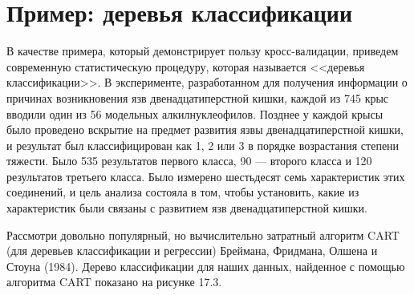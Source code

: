 \section{Пример: деревья классификации}
В качестве примера, который демонстрирует пользу кросс-валидации, приведем современную статистическую процедуру, которая называется <<деревья классификации>>. В эксперименте, разработанном для получения информации о причинах возникновения язв двенадцатиперстной кишки, каждой из 745 крыс вводили один из 56 модельных алкилнуклеофилов. Позднее у каждой крысы было проведено вскрытие на предмет развития язвы двенадцатиперстной кишки, и результат был классифицирован как 1, 2 или 3 в порядке возрастания степени тяжести. Было 535 результатов первого класса, 90 --- второго класса и 120 результатов третьего класса. Было измерено шестьдесят семь характеристик этих соединений, и цель анализа состояла в том, чтобы установить, какие из характеристик были связаны с развитием язв двенадцатиперстной кишки.
\begin{figure}[h]
\end{figure}

Рассмотри довольно популярный, но вычислительно затратный алгоритм CART (для деревьев классификации и регрессии) Бреймана, Фридмана, Олшена и Стоуна (1984). Дерево классификации для наших данных, найденное с помощью алгоритма CART показано на рисунке 17.3.

